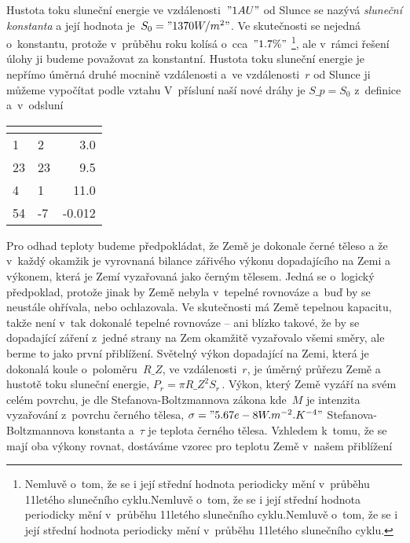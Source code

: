 \documentclass[twoside,fykos]{fksserie}
\begin{document}

Hustota toku sluneční energie ve vzdálenosti~$"1 AU"$ od Slunce se
nazývá {\it sluneční konstanta} a její hodnota je~$S_0 = "1370 W/m^2"$. Ve 
skutečnosti se nejedná o~konstantu, protože v~průběhu roku kolísá
o~cca~$"1.7 \%"$%
\footnote{Nemluvě o~tom, že se i její střední hodnota 
periodicky mění v~průběhu 11letého slunečního cyklu.Nemluvě o~tom, že se i její střední hodnota 
periodicky mění v~průběhu 11letého slunečního cyklu.Nemluvě o~tom, že se i její střední hodnota 
periodicky mění v~průběhu 11letého slunečního cyklu.},
ale v~rámci řešení úlohy
ji budeme považovat za konstantní. Hustota toku sluneční energie je 
nepřímo úměrná druhé mocnině vzdálenosti a~ve vzdálenosti~$r$ od 
Slunce ji můžeme vypočítat podle vztahu
V~přísluní naší nové dráhy je $S\_p = S_0$ z~definice a~v~odsluní

\begin{center}
\begin{tabular}{llD{.}{,}{-1}}
\toprule
{} &  & \\
 & 2 & 3.0\\
23 & 23 & 9.5\\
4 & 1 & 11.0\\
54 & -7 & -0.012\\
\bottomrule
\end{tabular}
\end{center}


Pro odhad teploty budeme předpokládat, že Země je dokonale černé 
těleso a že v~každý okamžik je vyrovnaná bilance zářivého výkonu 
dopadajícího na Zemi a výkonem, která je Zemí vyzařovaná jako 
černým tělesem. Jedná se o~logický předpoklad, protože jinak by Země
nebyla v~tepelné rovnováze a~buď by se neustále ohřívala, nebo 
ochlazovala. Ve skutečnosti má Země tepelnou kapacitu, takže není 
v~tak dokonalé tepelné rovnováze -- ani blízko takové, že by se 
dopadající záření z~jedné strany na Zem okamžitě vyzařovalo všemi 
směry, ale berme to jako první přiblížení. Světelný výkon dopadající
na Zemi, která je dokonalá koule o~poloměru~$R\_Z$, ve vzdálenosti~$r$,
je úměrný průřezu Země a hustotě toku sluneční energie, $
P_r = \pi R\_Z^2 S_r \,.  
$
Výkon, který Země vyzáří na svém celém povrchu, je dle 
Stefanova-Boltzmannova zákona 
kde~$M$ je intenzita vyzařování z~povrchu černého tělesa, $\sigma
= "5.67e-8 W.m^{-2}.K^{-4}"$ Stefanova-Boltzmannova konstanta 
a~$\tau$ je teplota černého tělesa. Vzhledem k~tomu, že se mají 
oba výkony rovnat, dostáváme vzorec pro teplotu Země v~našem přiblížení
\end{document}
